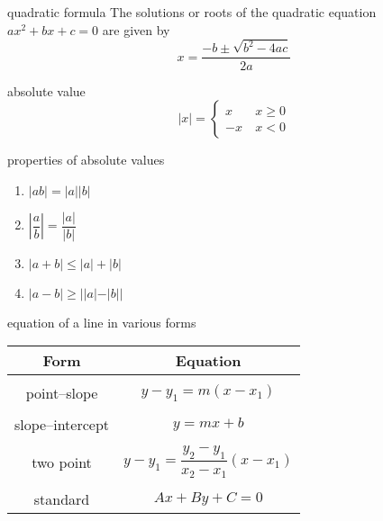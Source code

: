 \documentclass[fronts,frame,grid,avery5388]{flashcards}
\begin{document}
\begin{flashcard}[Formula]{quadratic formula}
The solutions or roots of the quadratic equation \\
$ax^2 + bx + c = 0$ are given by
\begin{equation*}
x = \dfrac{-b\pm \sqrt{b^2-4ac}}{2a}
\end{equation*}
\end{flashcard}

\begin{flashcard}[Definition]{absolute value}
\begin{equation*}
|x| = \left\{ \begin{array}{ll}
x & \: x \geq 0 \\
-x & \: x < 0
\end{array} \right.
\end{equation*}
\end{flashcard}

\begin{flashcard}[Theorem]{properties of absolute values}
\begin{enumerate}
\item $|ab| = |a||b|$
\item $\left| \dfrac{a}{b} \right| = \dfrac{|a|}{|b|}$
\item $|a+b| \leq |a| + |b|$
\item $|a-b| \geq ||a| - |b||$
\end{enumerate}

\end{flashcard}


\begin{flashcard}[Definition]{equation of a line in various forms}
\begin{tabular}{cc}
Form & Equation\\ \hline
\\
point--slope &  $y - y_{1} = m(x - x_{1})$\\
\\ 
slope--intercept &  $y = mx + b$\\
\\
two point &  $y - y_{1} = \dfrac{y_{2} - y_{1}}{x_{2}- x_{1}}(x - x_{1})$\\ 
\\
standard &  $Ax + By + C = 0$\\ 
\end{tabular} 
\end{flashcard}
\end{document}
